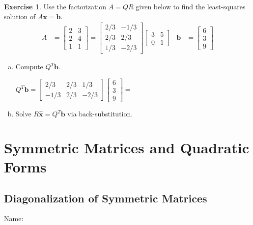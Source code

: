 \documentclass[10pt]{book}
\theoremstyle{definition}
\newtheorem{exercise}{Exercise}[section]
\newcommand{\name}[1][2.5in]{\vspace{-2.3em}\hfill Name: \underline{\hspace{#1}}}
\newcommand{\vect}[1]{\ensuremath{\boldsymbol{\mathbf{#1}}}}
\newcommand{\Axb}{A\vect{x}=\vect{b}}
\newcommand{\xhat}{\hat{\vect{x}}}
\begin{document}
\begin{exercise} %
	Use the factorization $A=QR$ given below to find the least-squares solution of $\Axb$.
	\begin{align*}
	A &= \begin{bmatrix}2&3\\2&4\\1&1\end{bmatrix} =
	\begin{bmatrix}2/3&-1/3\\2/3&2/3\\1/3&-2/3\end{bmatrix}
	\begin{bmatrix}3&5\\0&1\end{bmatrix} &
	\vect{b} &= \begin{bmatrix}6\\3\\9\end{bmatrix}
	\end{align*}
	\begin{enumerate}[(a)]
		\item Compute $Q^T\vect{b}$. \par
		$ Q^T\vect{b}= \begin{bmatrix}2/3&2/3&1/3\\-1/3&2/3&-2/3\end{bmatrix}
		\begin{bmatrix}6\\3\\9\end{bmatrix} = $
		\vspace{2em}
		\item Solve $R\xhat=Q^T\vect{b}$ via back-substitution.
		\vspace{1in}
	\end{enumerate}
\end{exercise}


\newpage


\chapter{Symmetric Matrices and Quadratic Forms}
\setcounter{section}{0}

\section[Diag. of Sym. Matrices]{Diagonalization of Symmetric Matrices}
\name[1.5in]
\end{document}
